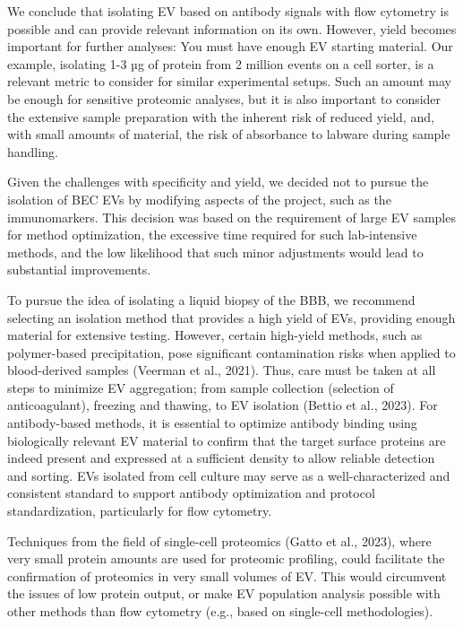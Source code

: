\documentclass[authordate, empirical, issue]{jote-new-article}
\begin{document}
	We conclude that isolating EV based on antibody signals with flow cytometry is possible and can provide relevant information on its own. However, yield becomes important for further analyses: You must have enough EV starting material. Our example, isolating 1-3 µg of protein from 2 million events on a cell sorter, is a relevant metric to consider for similar experimental setups. Such an amount may be enough for sensitive proteomic analyses, but it is also important to consider the extensive sample preparation with the inherent risk of reduced yield, and, with small amounts of material, the risk of absorbance to labware during sample handling.



	Given the challenges with specificity and yield, we decided not to pursue the isolation of BEC EVs by modifying aspects of the project, such as the immunomarkers. This decision was based on the requirement of large EV samples for method optimization, the excessive time required for such lab-intensive methods, and the low likelihood that such minor adjustments would lead to substantial improvements.



	To pursue the idea of isolating a liquid biopsy of the BBB, we recommend selecting an isolation method that provides a high yield of EVs, providing enough material for extensive testing. However, certain high-yield methods, such as polymer-based precipitation, pose significant contamination risks when applied to blood-derived samples (Veerman et al., 2021). Thus, care must be taken at all steps to minimize EV aggregation; from sample collection (selection of anticoagulant), freezing and thawing, to EV isolation (Bettio et al., 2023). For antibody-based methods, it is essential to optimize antibody binding using biologically relevant EV material to confirm that the target surface proteins are indeed present and expressed at a sufficient density to allow reliable detection and sorting. EVs isolated from cell culture may serve as a well-characterized and consistent standard to support antibody optimization and protocol standardization, particularly for flow cytometry.



	Techniques from the field of single-cell proteomics (Gatto et al., 2023), where very small protein amounts are used for proteomic profiling, could facilitate the confirmation of proteomics in very small volumes of EV. This would circumvent the issues of low protein output, or make EV population analysis possible with other methods than flow cytometry (e.g., based on single-cell methodologies).
\end{document}
